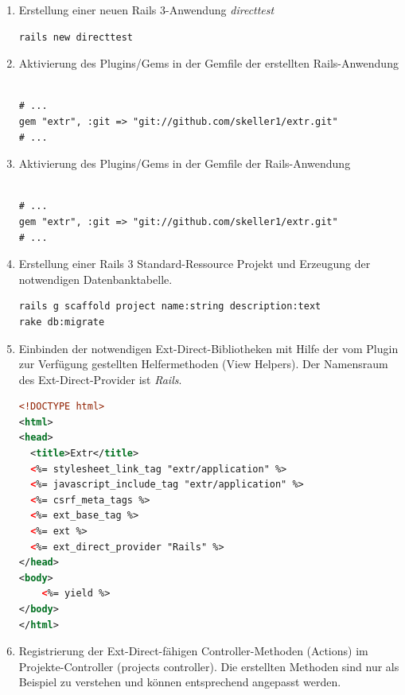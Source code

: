 \begin{enumerate}
\item
Erstellung einer neuen Rails 3-Anwendung \emph{directtest}
\begin{lstlisting}[frame=single, numbers=none]
rails new directtest
\end{lstlisting}
\item
Aktivierung des Plugins/Gems in der Gemfile der erstellten Rails-Anwendung

\begin{lstlisting}[frame=single, numbers=none]

# ...
gem "extr", :git => "git://github.com/skeller1/extr.git"
# ...

\end{lstlisting}

\item
Aktivierung des Plugins/Gems in der Gemfile der Rails-Anwendung

\begin{lstlisting}[frame=single, title= \emph{Gemfile}, numbers=none]

# ...
gem "extr", :git => "git://github.com/skeller1/extr.git"
# ...

\end{lstlisting}

\item
Erstellung einer Rails 3 Standard-Ressource Projekt und Erzeugung der notwendigen Datenbanktabelle.

\begin{lstlisting}[frame=single, numbers=none]
rails g scaffold project name:string description:text
rake db:migrate
\end{lstlisting}

\item
Einbinden der notwendigen Ext-Direct-Bibliotheken mit Hilfe der vom Plugin zur Verfügung gestellten Helfermethoden (View Helpers). Der Namensraum des Ext-Direct-Provider ist \emph{Rails}.

\begin{lstlisting}[language=xml,frame=single,title=\emph{app/views/layouts/application.html.erb}, numbers=none]
<!DOCTYPE html>
<html>
<head>
  <title>Extr</title>
  <%= stylesheet_link_tag "extr/application" %>
  <%= javascript_include_tag "extr/application" %>
  <%= csrf_meta_tags %>
  <%= ext_base_tag %>
  <%= ext %>
  <%= ext_direct_provider "Rails" %>
</head>
<body>
    <%= yield %>
</body>
</html>
\end{lstlisting}

\item
Registrierung der Ext-Direct-fähigen Controller-Methoden (Actions) im Projekte-Controller (projects controller). Die erstellten Methoden sind nur als Beispiel zu verstehen und können entsprechend angepasst werden.


\end{enumerate}
